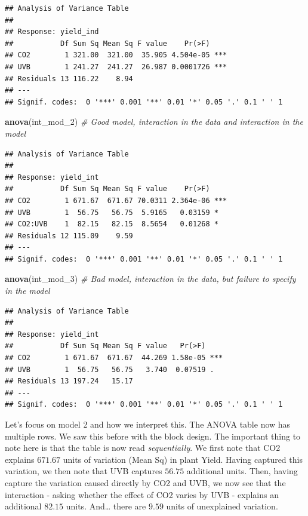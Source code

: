 \documentclass[
]{book}
\newenvironment{Shaded}{\begin{snugshade}}{\end{snugshade}}
\newcommand{\CommentTok}[1]{\textcolor[rgb]{0.56,0.35,0.01}{\textit{#1}}}
\newcommand{\FunctionTok}[1]{\textcolor[rgb]{0.13,0.29,0.53}{\textbf{#1}}}
\newcommand{\NormalTok}[1]{#1}
\begin{document}
\begin{verbatim}
## Analysis of Variance Table
## 
## Response: yield_ind
##           Df Sum Sq Mean Sq F value    Pr(>F)    
## CO2        1 321.00  321.00  35.905 4.504e-05 ***
## UVB        1 241.27  241.27  26.987 0.0001726 ***
## Residuals 13 116.22    8.94                      
## ---
## Signif. codes:  0 '***' 0.001 '**' 0.01 '*' 0.05 '.' 0.1 ' ' 1
\end{verbatim}

\begin{Shaded}
\begin{Highlighting}[]
\FunctionTok{anova}\NormalTok{(int\_mod\_2) }\CommentTok{\# Good model, interaction in the data and interaction in the model}
\end{Highlighting}
\end{Shaded}

\begin{verbatim}
## Analysis of Variance Table
## 
## Response: yield_int
##           Df Sum Sq Mean Sq F value    Pr(>F)    
## CO2        1 671.67  671.67 70.0311 2.364e-06 ***
## UVB        1  56.75   56.75  5.9165   0.03159 *  
## CO2:UVB    1  82.15   82.15  8.5654   0.01268 *  
## Residuals 12 115.09    9.59                      
## ---
## Signif. codes:  0 '***' 0.001 '**' 0.01 '*' 0.05 '.' 0.1 ' ' 1
\end{verbatim}

\begin{Shaded}
\begin{Highlighting}[]
\FunctionTok{anova}\NormalTok{(int\_mod\_3) }\CommentTok{\# Bad model, interaction in the data, but failure to specify in the model}
\end{Highlighting}
\end{Shaded}

\begin{verbatim}
## Analysis of Variance Table
## 
## Response: yield_int
##           Df Sum Sq Mean Sq F value   Pr(>F)    
## CO2        1 671.67  671.67  44.269 1.58e-05 ***
## UVB        1  56.75   56.75   3.740  0.07519 .  
## Residuals 13 197.24   15.17                     
## ---
## Signif. codes:  0 '***' 0.001 '**' 0.01 '*' 0.05 '.' 0.1 ' ' 1
\end{verbatim}

Let's focus on model 2 and how we interpret this. The ANOVA table now has multiple rows. We saw this before with the block design. The important thing to note here is that the table is now read \emph{sequentially}. We first note that CO2 explains \(671.67\) units of variation (Mean Sq) in plant Yield. Having captured this variation, we then note that UVB captures \(56.75\) additional units. Then, having capture the variation caused directly by CO2 and UVB, we now see that the interaction - asking whether the effect of CO2 varies by UVB - explains an additional \(82.15\) units. And\ldots{} there are \(9.59\) units of unexplained variation.
\end{document}
